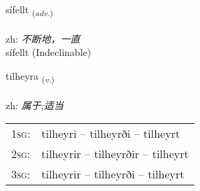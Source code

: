 \documentclass[frontgrid, backgrid]{flacards}\usepackage[]{graphicx}\usepackage[]{color}
\begin{document}

\renewcommand{\flhead}{\vskip5pt \fboxsep=0pt {\small\bfseries\footnotesize Atviksorð | 副词}}
\renewcommand{\fcfoot}{\vskip5pt \fboxsep=0pt \hspace{2pt}{\small\bfseries\footnotesize 2K}}

\renewcommand{\blhead}{\vskip5pt {\small\bfseries\footnotesize Atviksorð | 副词 }}
\renewcommand{\bcfoot}{\vskip5pt \hspace{2pt}{\small\bfseries\footnotesize 2K}}


{sífellt \small{\textsubscript{(\textit{adv.})}} \\[1ex]
\textphonetic{[siːfɛl̥t]} \\
zh: \emph{不断地，一直} \\  [2ex]
sífellt (Indeclinable)}

\renewcommand{\flhead}{\vskip5pt \fboxsep=0pt {\small\bfseries\footnotesize Sagnorð | 动词}}
\renewcommand{\fcfoot}{\vskip5pt \fboxsep=0pt \hspace{2pt}{\small\bfseries\footnotesize 2K}}

\renewcommand{\blhead}{\vskip5pt {\small\bfseries\footnotesize Sagnorð | 动词 }}
\renewcommand{\bcfoot}{\vskip5pt \hspace{2pt}{\small\bfseries\footnotesize 2K}}


{tilheyra \small{\textsubscript{(\textit{v.})}} \\[1ex] %
\textphonetic{[tʰɪlheira]} \\
zh: \emph{属于;适当} \\  [2ex]
\renewcommand*{\arraystretch}{0.8}
\begin{tabular}{p{1cm}l}
\textsc{1sg}: & tilheyri -- tilheyrði -- tilheyrt \\ 
\textsc{2sg}: & tilheyrir -- tilheyrðir -- tilheyrt \\ 
\textsc{3sg}: & tilheyrir -- tilheyrði -- tilheyrt \\ 
\end{tabular}
}
\end{document}
